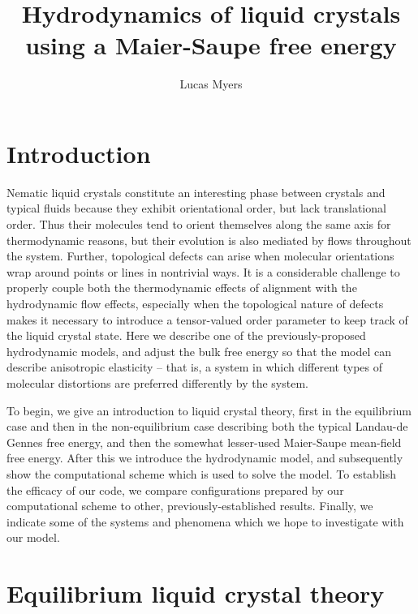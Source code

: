 \documentclass[reqno]{article}
\begin{document}
	\title{Hydrodynamics of liquid crystals using a Maier-Saupe free energy}
	\author{Lucas Myers}
	\maketitle

  \section{Introduction}
  Nematic liquid crystals constitute an interesting phase between crystals and
  typical fluids because they exhibit orientational order, but lack
  translational order.
  Thus their molecules tend to orient themselves along the same axis for thermodynamic
  reasons, but their evolution is also mediated by flows throughout the system.
  Further, topological defects can arise when molecular orientations wrap around
  points or lines in nontrivial ways.
  It is a considerable challenge to properly couple both the thermodynamic
  effects of alignment with the hydrodynamic flow effects, especially when the
  topological nature of defects makes it necessary to introduce a tensor-valued
  order parameter to keep track of the liquid crystal state.
  Here we describe one of the previously-proposed hydrodynamic models, and
  adjust the bulk free energy so that the model can describe anisotropic
  elasticity -- that is, a system in which different types of molecular
  distortions are preferred differently by the system.

  To begin, we give an introduction to liquid crystal theory, first in the
  equilibrium case and then in the non-equilibrium case describing both the
  typical Landau-de Gennes free energy, and then the somewhat lesser-used
  Maier-Saupe mean-field free energy.
  After this we introduce the hydrodynamic model, and subsequently show the
  computational scheme which is used to solve the model.
  To establish the efficacy of our code, we compare configurations prepared by
  our computational scheme to other, previously-established results.
  Finally, we indicate some of the systems and phenomena which we hope to
  investigate with our model.
  
	\section{Equilibrium liquid crystal theory}
\end{document}
